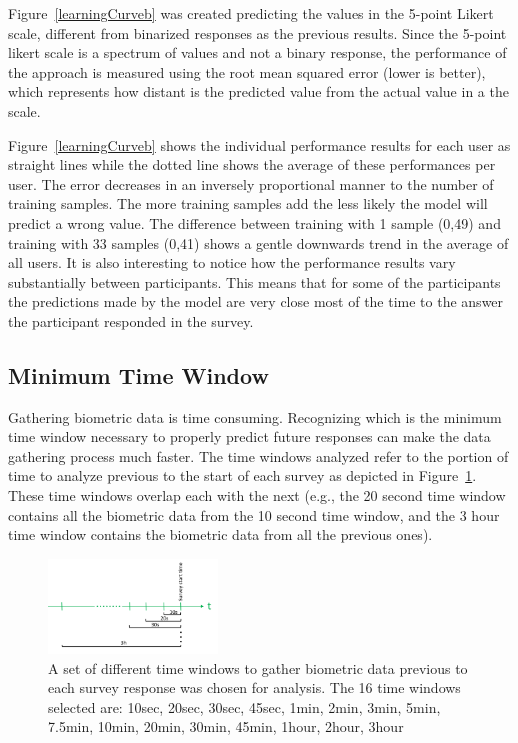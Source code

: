 Figure~\ref{learningCurveb} 
was created predicting the values in the 5-point
Likert scale, different from binarized responses
as the previous results.
Since the 5-point likert scale is a spectrum
of values and not a binary response, 
the performance of the approach is 
measured using the root mean squared error (lower is better),
which represents how distant is the 
predicted value from the actual value in a 
the scale. 

Figure~\ref{learningCurveb} shows the individual
performance results for each user as straight lines
while the dotted line shows the average of these
performances per user.
The error decreases in an inversely proportional manner
to the number of training samples. The
more training samples add the less likely the 
model will predict a wrong value.
The difference between training with 1 sample (0,49) and training
with 33 samples (0,41) shows a gentle downwards trend in the 
average of all
users.
It is also interesting to notice how the performance results
vary substantially between participants. This means
that for some of the participants the predictions made
by the model are very close most of the time 
to the answer the participant responded
in the survey.

\subsection{Minimum Time Window}
\label{secMinimumTW}
Gathering biometric data is time consuming.
Recognizing which is the minimum time window necessary
to properly predict future responses can make the data
gathering process much faster.
The time windows analyzed refer to the portion of 
time to analyze previous to the start of each survey as 
depicted in Figure~\ref{timeWindows}. These time
windows overlap each with the next (e.g., the 
20 second time window contains all the biometric
data from the 10 second time window, and the
3 hour time window contains the biometric data from
all the previous ones).

\begin{figure}
  \centering
      \includegraphics[width=0.4\textwidth]{timeWindows.png}
  \caption{A set of different time windows to gather biometric data previous to each survey response was chosen for analysis. The 16 time windows selected are: 10sec, 20sec, 30sec, 45sec, 1min, 2min, 3min, 5min, 7.5min, 10min, 20min, 30min, 45min, 1hour, 2hour, 3hour}
   \label{timeWindows}
\end{figure}

